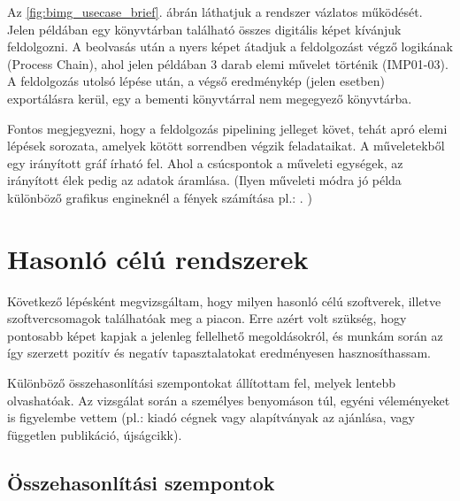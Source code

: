 \documentclass[a4paper,12pt,oneside]{report}
\begin{document}
Az  \ref{fig:bimg_usecase_brief}. ábrán láthatjuk a rendszer vázlatos működését. Jelen példában egy könyvtárban található összes digitális képet kívánjuk feldolgozni. A beolvasás után a nyers képet átadjuk a feldolgozást végző logikának (Process Chain), ahol jelen példában 3 darab elemi művelet történik (IMP01-03). A feldolgozás utolsó lépése után, a végső eredménykép (jelen esetben) exportálásra kerül, egy a bementi könyvtárral nem megegyező könyvtárba.

Fontos megjegyezni, hogy a feldolgozás pipelining \cite{book:pipelining_def} jelleget követ, tehát apró elemi lépések sorozata, amelyek kötött sorrendben végzik feladataikat. A műveletekből egy irányított gráf írható fel. Ahol a csúcspontok a műveleti egységek, az irányított élek pedig az adatok áramlása. (Ilyen műveleti módra jó példa különböző grafikus engineknél a fények számítása pl.: \cite{website:valve_shading_tree}. )

\section{Hasonló célú rendszerek}
Következő lépésként megvizsgáltam, hogy milyen hasonló célú szoftverek, illetve szoftvercsomagok találhatóak meg a piacon. Erre azért volt szükség, hogy pontosabb képet kapjak a jelenleg fellelhető megoldásokról, és munkám során az így szerzett pozitív és negatív tapasztalatokat eredményesen hasznosíthassam.

Különböző összehasonlítási szempontokat állítottam fel, melyek lentebb olvashatóak. Az vizsgálat során a személyes benyomáson túl, egyéni véleményeket is figyelembe vettem (pl.: kiadó cégnek vagy alapítványak az ajánlása, vagy független publikáció, újságcikk).
\subsection{Összehasonlítási szempontok}
\end{document}
